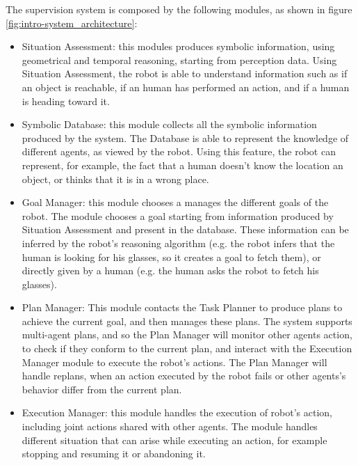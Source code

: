 The supervision system is composed by the following modules, as shown in figure \ref{fig:intro-system_architecture}:
\begin{itemize}
\item Situation Assessment: this modules produces symbolic information, using geometrical and temporal reasoning, starting from perception data. Using Situation Assessment, the robot is able to understand information such as if an object is reachable, if an human has performed an action, and if a human is heading toward it.
\item Symbolic Database: this module collects all the symbolic information produced by the system. The Database is able to represent the knowledge of different agents, as viewed by the robot. Using this feature, the robot can represent, for example, the fact that a human doesn't know the location an object, or thinks that it is in a wrong place.
\item Goal Manager: this module chooses a manages the different goals of the robot. The module chooses a goal starting from information produced by Situation Assessment and present in the database. These information can be inferred by the robot's reasoning algorithm (e.g. the robot infers that the human is looking for his glasses, so it creates a goal to fetch them), or directly given by a human (e.g. the human asks the robot to fetch his glasses). 
\item Plan Manager: This module contacts the Task Planner to produce plans to achieve the current goal, and then manages these plans. The system supports multi-agent plans, and so the Plan Manager will monitor other agents action, to check if they conform to the current plan, and interact with the Execution Manager module to execute the robot's actions. The Plan Manager will handle replans, when an action executed by the robot fails or other agents's behavior differ from the current plan.
\item Execution Manager: this module handles the execution of robot's action, including joint actions shared with other agents. The module handles different situation that can arise while executing an action, for example stopping and resuming it or abandoning it.
\end{itemize}

